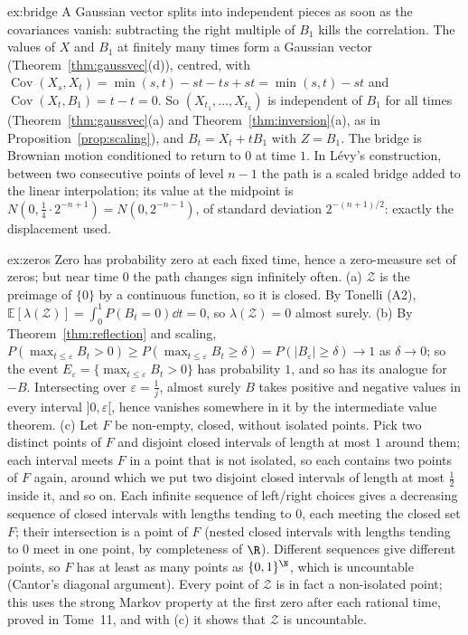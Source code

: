 \begin{solution}{ex:bridge}
\idea A Gaussian vector splits into independent pieces as soon as the covariances vanish: subtracting the right multiple
of $B_1$ kills the correlation.
\writeup The values of $X$ and $B_1$ at finitely many times form a Gaussian vector (Theorem~\ref{thm:gaussvec}(d)), centred, with
$\operatorname{Cov}(X_s,X_t)=\min(s,t)-st-ts+st=\min(s,t)-st$ and $\operatorname{Cov}(X_t,B_1)=t-t=0$. So $(X_{t_1},\dots,X_{t_k})$ is independent of $B_1$ for all times (Theorem~\ref{thm:gaussvec}(a) and
Theorem~\ref{thm:inversion}(a), as in Proposition~\ref{prop:scaling}), and $B_t=X_t+tB_1$ with $Z=B_1$. The bridge is Brownian motion conditioned to return to $0$ at time $1$.
In L\'evy's construction, between two consecutive points of level $n-1$ the path is a scaled bridge added to the linear interpolation; its value at the
midpoint is $N(0,\frac14\cdot2^{-n+1})=N(0,2^{-n-1})$, of standard deviation $2^{-(n+1)/2}$: exactly the displacement used.
\end{solution}

\begin{solution}{ex:zeros}
\idea Zero has probability zero at each fixed time, hence a zero-measure set of zeros; but near time $0$ the path
changes sign infinitely often.
\writeup (a) $\mathcal Z$ is the preimage of $\{0\}$ by a continuous function, so it is closed. By Tonelli (A2), $\mathbb E[\lambda(\mathcal Z)]=\int_0^1P(B_t=0)\dd t=0$, so $\lambda(\mathcal Z)=0$ almost surely.
(b) By Theorem~\ref{thm:reflection} and scaling, $P(\max_{t\le\varepsilon}B_t>0)\ge P(\max_{t\le\varepsilon}B_t\ge\delta)=P(|B_\varepsilon|\ge\delta)\to1$ as $\delta\to0$; so the event $E_\varepsilon=\{\max_{t\le\varepsilon}B_t>0\}$ has
probability $1$, and so has its analogue for $-B$. Intersecting over $\varepsilon=\frac1j$, almost surely $B$ takes positive and negative values in every
interval $]0,\varepsilon[$, hence vanishes somewhere in it by the intermediate value theorem.
(c) Let $F$ be non-empty, closed, without isolated points. Pick two distinct points of $F$ and disjoint closed intervals of length
at most $1$ around them; each interval meets $F$ in a point that is not isolated, so each contains two points of $F$ again, around which
we put two disjoint closed intervals of length at most $\frac12$ inside it, and so on. Each infinite sequence of left/right choices gives
a decreasing sequence of closed intervals with lengths tending to $0$, each meeting the closed set $F$; their intersection is a point of
$F$ (nested closed intervals with lengths tending to $0$ meet in one point, by completeness of $\R$). Different sequences give different points, so $F$
has at least as many points as $\{0,1\}^{\N}$, which is uncountable (Cantor's diagonal argument). Every point of $\mathcal Z$ is in fact a non-isolated point; this uses the strong Markov
property at the first zero after each rational time, proved in Tome~11, and with (c) it shows that $\mathcal Z$ is uncountable.
\end{solution}

